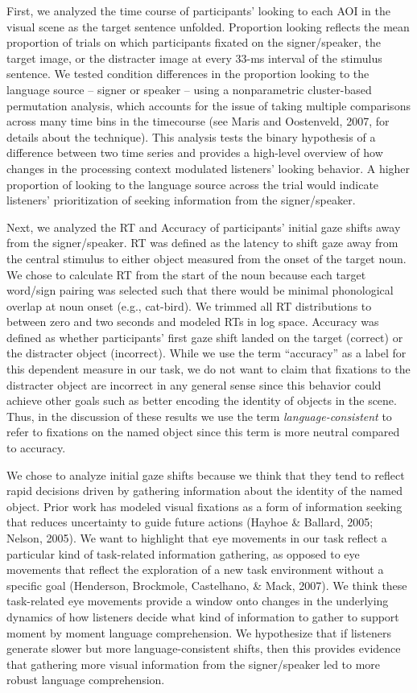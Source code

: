 \documentclass[,man,floatsintext]{apa6}
\begin{document}
First, we analyzed the time course of participants' looking to each AOI in the visual scene as the target sentence unfolded. Proportion looking reflects the mean proportion of trials on which participants fixated on the signer/speaker, the target image, or the distracter image at every 33-ms interval of the stimulus sentence. We tested condition differences in the proportion looking to the language source -- signer or speaker -- using a nonparametric cluster-based permutation analysis, which accounts for the issue of taking multiple comparisons across many time bins in the timecourse (see Maris and Oostenveld, 2007, for details about the technique). This analysis tests the binary hypothesis of a difference between two time series and provides a high-level overview of how changes in the processing context modulated listeners' looking behavior. A higher proportion of looking to the language source across the trial would indicate listeners' prioritization of seeking information from the signer/speaker.

Next, we analyzed the RT and Accuracy of participants' initial gaze shifts away from the signer/speaker. RT was defined as the latency to shift gaze away from the central stimulus to either object measured from the onset of the target noun. We chose to calculate RT from the start of the noun because each target word/sign pairing was selected such that there would be minimal phonological overlap at noun onset (e.g., cat-bird). We trimmed all RT distributions to between zero and two seconds and modeled RTs in log space. Accuracy was defined as whether participants' first gaze shift landed on the target (correct) or the distracter object (incorrect). While we use the term \enquote{accuracy} as a label for this dependent measure in our task, we do not want to claim that fixations to the distracter object are incorrect in any general sense since this behavior could achieve other goals such as better encoding the identity of objects in the scene. Thus, in the discussion of these results we use the term \emph{language-consistent} to refer to fixations on the named object since this term is more neutral compared to accuracy.

We chose to analyze initial gaze shifts because we think that they tend to reflect rapid decisions driven by gathering information about the identity of the named object. Prior work has modeled visual fixations as a form of information seeking that reduces uncertainty to guide future actions (Hayhoe \& Ballard, 2005; Nelson, 2005). We want to highlight that eye movements in our task reflect a particular kind of task-related information gathering, as opposed to eye movements that reflect the exploration of a new task environment without a specific goal (Henderson, Brockmole, Castelhano, \& Mack, 2007). We think these task-related eye movements provide a window onto changes in the underlying dynamics of how listeners decide what kind of information to gather to support moment by moment language comprehension. We hypothesize that if listeners generate slower but more language-consistent shifts, then this provides evidence that gathering more visual information from the signer/speaker led to more robust language comprehension.
\end{document}
